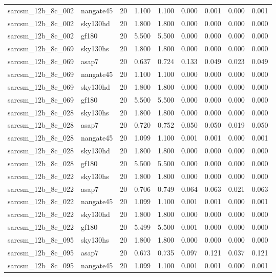 \begin{tabular}{llrrrrrrr}
sarcsm\_12b\_8c\_002 & nangate45 & 20 & 1.100 & 1.100 & 0.000 & 0.001 & 0.000 & 0.001 \\
sarcsm\_12b\_8c\_002 & sky130hd & 20 & 1.800 & 1.800 & 0.000 & 0.000 & 0.000 & 0.000 \\
sarcsm\_12b\_8c\_002 & gf180 & 20 & 5.500 & 5.500 & 0.000 & 0.000 & 0.000 & 0.000 \\
sarcsm\_12b\_8c\_069 & sky130hs & 20 & 1.800 & 1.800 & 0.000 & 0.000 & 0.000 & 0.000 \\
sarcsm\_12b\_8c\_069 & asap7 & 20 & 0.637 & 0.724 & 0.133 & 0.049 & 0.023 & 0.049 \\
sarcsm\_12b\_8c\_069 & nangate45 & 20 & 1.100 & 1.100 & 0.000 & 0.000 & 0.000 & 0.000 \\
sarcsm\_12b\_8c\_069 & sky130hd & 20 & 1.800 & 1.800 & 0.000 & 0.000 & 0.000 & 0.000 \\
sarcsm\_12b\_8c\_069 & gf180 & 20 & 5.500 & 5.500 & 0.000 & 0.000 & 0.000 & 0.000 \\
sarcsm\_12b\_8c\_028 & sky130hs & 20 & 1.800 & 1.800 & 0.000 & 0.000 & 0.000 & 0.000 \\
sarcsm\_12b\_8c\_028 & asap7 & 20 & 0.720 & 0.752 & 0.050 & 0.050 & 0.019 & 0.050 \\
sarcsm\_12b\_8c\_028 & nangate45 & 20 & 1.099 & 1.100 & 0.001 & 0.001 & 0.000 & 0.001 \\
sarcsm\_12b\_8c\_028 & sky130hd & 20 & 1.800 & 1.800 & 0.000 & 0.000 & 0.000 & 0.000 \\
sarcsm\_12b\_8c\_028 & gf180 & 20 & 5.500 & 5.500 & 0.000 & 0.000 & 0.000 & 0.000 \\
sarcsm\_12b\_8c\_022 & sky130hs & 20 & 1.800 & 1.800 & 0.000 & 0.000 & 0.000 & 0.000 \\
sarcsm\_12b\_8c\_022 & asap7 & 20 & 0.706 & 0.749 & 0.064 & 0.063 & 0.021 & 0.063 \\
sarcsm\_12b\_8c\_022 & nangate45 & 20 & 1.099 & 1.100 & 0.001 & 0.001 & 0.000 & 0.001 \\
sarcsm\_12b\_8c\_022 & sky130hd & 20 & 1.800 & 1.800 & 0.000 & 0.000 & 0.000 & 0.000 \\
sarcsm\_12b\_8c\_022 & gf180 & 20 & 5.499 & 5.500 & 0.001 & 0.000 & 0.000 & 0.000 \\
sarcsm\_12b\_8c\_095 & sky130hs & 20 & 1.800 & 1.800 & 0.000 & 0.000 & 0.000 & 0.000 \\
sarcsm\_12b\_8c\_095 & asap7 & 20 & 0.673 & 0.735 & 0.097 & 0.121 & 0.037 & 0.121 \\
sarcsm\_12b\_8c\_095 & nangate45 & 20 & 1.099 & 1.100 & 0.001 & 0.001 & 0.000 & 0.001 \\

\end{tabular}
